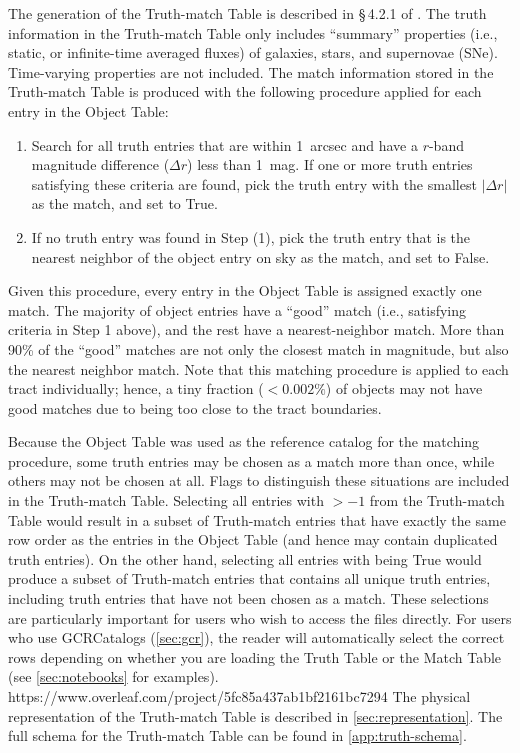\documentclass[modern]{descnote}
\begin{document}
The generation of the Truth-match Table is described in \S\,4.2.1 of \cite{2020arXiv201005926L}. The truth information in the Truth-match Table only includes ``summary'' properties (i.e., static, or infinite-time averaged fluxes) of galaxies, stars, and supernovae (SNe). Time-varying properties are not included. The match information stored in the  Truth-match Table is produced with the following procedure applied for each entry in the Object Table:
\begin{enumerate}
    \item Search for all truth entries that are within 1~arcsec and have a $r$-band magnitude difference ($\Delta r$) less than 1~mag. If one or more truth entries satisfying these criteria are found, pick the truth entry with the smallest $|\Delta r|$ as the match, and set  to True.
    \item If no truth entry was found in Step (1), pick the truth entry that is the nearest neighbor of the object entry on sky as the match, and set  to False.
\end{enumerate}
Given this procedure, every entry in the Object Table is assigned exactly one match. The majority of object entries have a ``good'' match (i.e., satisfying criteria in Step 1 above), and the rest have a nearest-neighbor match. More than 90\% of the ``good'' matches are not only the closest match in magnitude, but also the nearest neighbor match. 
Note that this matching procedure is applied to each tract individually; hence, a tiny fraction ($<0.002\%$) of objects may not have good matches due to being too close to the tract boundaries. 

Because the Object Table was used as the reference catalog for the matching procedure, some truth entries may be chosen as a match more than once, while others may not be chosen at all.
Flags to distinguish these situations are included in the Truth-match Table. 
Selecting all entries with  $> -1$ from the Truth-match Table would result in a subset of Truth-match entries that have exactly the same row order as the entries in the Object Table (and hence may contain duplicated truth entries). On the other hand, selecting all entries with  being True would produce a subset of Truth-match entries that contains all unique truth entries, including truth entries that have not been chosen as a match.
These selections are particularly important for users who wish to access the files directly. For users who use GCRCatalogs (\autoref{sec:gcr}), the reader will automatically select the correct rows depending on whether you are loading the Truth Table or the Match Table (see \autoref{sec:notebooks} for examples).
https://www.overleaf.com/project/5fc85a437ab1bf2161bc7294
The physical representation of the Truth-match Table is described in \autoref{sec:representation}. The full schema for the Truth-match Table can be found in \autoref{app:truth-schema}.
\end{document}
